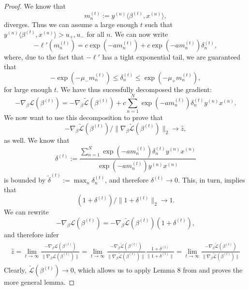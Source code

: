 \documentclass{article}
\theoremstyle{plain}
\theoremstyle{definition}
\theoremstyle{remark}
\begin{document}
\begin{proof}
We know that
\begin{equation}
    m_n^{(t)}:=y^{(n)}\langle\beta^{(t)},x^{(n)}\rangle,
\end{equation}
diverges.
Thus we can assume a large enough $t$ such that $y^{(n)}\langle\beta^{(t)},x^{(n)}\rangle>u_+,u_-$ for all $n$.
We can now write
\begin{equation}
    -\ell'(m_n^{(t)})=c\exp(-am_n^{(t)})+c\exp(-am_n^{(t)})\delta_n^{(t)},
\end{equation}
where, due to the fact that $-\ell'$ has a tight exponential tail, we are guaranteed that
\begin{equation}
    -\exp(-\mu_-m_n^{(t)})\leq\delta_n^{(t)}\leq\exp(-\mu_+m_n^{(t)}),
\end{equation}
for large enough $t$.
We have thus sucessfully decomposed the gradient:
\begin{equation}
    -\nabla_{\beta}\mathcal{L}(\beta^{(t)})=-\nabla_{\beta}\tilde{\mathcal{L}}(\beta^{(t)})+c\sum_{n=1}^N\exp(-am_n^{(t)})\delta_n^{(t)}y^{(n)}x^{(n)}.
\end{equation}
We now want to use this decomposition to prove that
\begin{equation}
    -\nabla_{\beta}\tilde{\mathcal{L}}(\beta^{(t)})/\|\nabla_{\beta}\tilde{\mathcal{L}}(\beta^{(t)})\|_2\to \hat{z},
\end{equation}
as well.
We know that
\begin{equation}
    \delta^{(t)}:=\frac{\sum_{n=1}^N\exp(-am_n^{(t)})\delta_n^{(t)}y^{(n)}x^{(n)}}
    {\exp(-am_n^{(t)})y^{(n)}x^{(n)}}
\end{equation}
is bounded by $\tilde{\delta}^{(t)}:=\max_n\delta_n^{(t)}$, and therefore $\delta^{(t)}\to0$.
This, in turn, implies that
\begin{equation}
    (1+\delta^{(t)})/\|1+\delta^{(t)}\|_2\to1.
\end{equation}
We can rewrite
\begin{equation}
    -\nabla_{\beta}\mathcal{L}(\beta^{(t)})=-\nabla_{\beta}\tilde{\mathcal{L}}(\beta^{(t)})(1+\delta^{(t)}),
\end{equation}
and therefore infer
\begin{align}
\begin{split}
    \hat{z}
    =\lim_{t\to\infty}\frac{-\nabla_{\beta}\mathcal{L}(\beta^{(t)})}{\|\nabla_{\beta}\mathcal{L}(\beta^{(t)})\|}
    =\lim_{t\to\infty}\frac{-\nabla_{\beta}\tilde{\mathcal{L}}(\beta^{(t)})}{\|\nabla_{\beta}\tilde{\mathcal{L}}(\beta^{(t)})\|}\frac{1+\delta^{(t)}}{\|1+\delta^{(t)}\|}
    =\lim_{t\to\infty}\frac{-\nabla_{\beta}\tilde{\mathcal{L}}(\beta^{(t)})}{\|\nabla_{\beta}\tilde{\mathcal{L}}(\beta^{(t)})\|}
\end{split}
\end{align}
Clearly, $\tilde{\mathcal{L}}(\beta^{(t)})\to0$, which allows us to apply Lemma 8 from \citet{gunasekar_characterizing_2018} and proves the more general lemma.
\end{proof}
\end{document}
